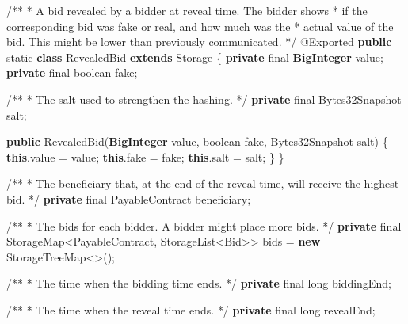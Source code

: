 \documentclass[a4paper,]{book}
\newenvironment{Shaded}{\begin{snugshade}}{\end{snugshade}}
\newcommand{\AttributeTok}[1]{\textcolor[rgb]{0.00,0.34,0.68}{#1}}
\newcommand{\BuiltInTok}[1]{\textcolor[rgb]{0.39,0.29,0.61}{\textbf{#1}}}
\newcommand{\CommentTok}[1]{\textcolor[rgb]{0.54,0.53,0.53}{#1}}
\newcommand{\DataTypeTok}[1]{\textcolor[rgb]{0.00,0.34,0.68}{#1}}
\newcommand{\FunctionTok}[1]{\textcolor[rgb]{0.39,0.29,0.61}{#1}}
\newcommand{\KeywordTok}[1]{\textcolor[rgb]{0.12,0.11,0.11}{\textbf{#1}}}
\newcommand{\NormalTok}[1]{\textcolor[rgb]{0.12,0.11,0.11}{#1}}
\renewenvironment{Shaded}{\begin{snugshade}\small}{\end{snugshade}}
\begin{document}
{\begin{Shaded}
\begin{Highlighting}[]
  \CommentTok{/**}
   \CommentTok{*}\NormalTok{ A bid revealed by a bidder at reveal time}\CommentTok{. }\NormalTok{The bidder shows}
   \CommentTok{*}\NormalTok{ if the corresponding bid was fake or real}\CommentTok{,}\NormalTok{ and how much was the}
   \CommentTok{*}\NormalTok{ actual value of the bid}\CommentTok{.}\NormalTok{ This might be lower than previously communicated}\CommentTok{.}
   \CommentTok{*/}
  \AttributeTok{@Exported}
  \KeywordTok{public} \DataTypeTok{static} \KeywordTok{class}\NormalTok{ RevealedBid }\KeywordTok{extends}\NormalTok{ Storage \{}
    \KeywordTok{private} \DataTypeTok{final} \BuiltInTok{BigInteger}\NormalTok{ value;}
    \KeywordTok{private} \DataTypeTok{final} \DataTypeTok{boolean}\NormalTok{ fake;}

    \CommentTok{/**}
     \CommentTok{*}\NormalTok{ The salt used to strengthen the hashing}\CommentTok{.}
     \CommentTok{*/}
    \KeywordTok{private} \DataTypeTok{final}\NormalTok{ Bytes32Snapshot salt;}

    \KeywordTok{public} \FunctionTok{RevealedBid}\NormalTok{(}\BuiltInTok{BigInteger}\NormalTok{ value, }\DataTypeTok{boolean}\NormalTok{ fake, Bytes32Snapshot salt) \{}
      \KeywordTok{this}\NormalTok{.}\FunctionTok{value}\NormalTok{ = value;}
      \KeywordTok{this}\NormalTok{.}\FunctionTok{fake}\NormalTok{ = fake;}
      \KeywordTok{this}\NormalTok{.}\FunctionTok{salt}\NormalTok{ = salt;}
\NormalTok{    \}}
\NormalTok{  \}}

  \CommentTok{/**}
   \CommentTok{*}\NormalTok{ The beneficiary that}\CommentTok{,}\NormalTok{ at the end of the reveal time}\CommentTok{,}\NormalTok{ will receive the highest bid}\CommentTok{.}
   \CommentTok{*/}
  \KeywordTok{private} \DataTypeTok{final}\NormalTok{ PayableContract beneficiary;}

  \CommentTok{/**}
   \CommentTok{*}\NormalTok{ The bids for each bidder}\CommentTok{. }\NormalTok{A bidder might place more bids}\CommentTok{.}
   \CommentTok{*/}
  \KeywordTok{private} \DataTypeTok{final}\NormalTok{ StorageMap<PayableContract, StorageList<Bid>> bids = }\KeywordTok{new}\NormalTok{ StorageTreeMap<>();}

  \CommentTok{/**}
   \CommentTok{*}\NormalTok{ The time when the bidding time ends}\CommentTok{.}
   \CommentTok{*/}
  \KeywordTok{private} \DataTypeTok{final} \DataTypeTok{long}\NormalTok{ biddingEnd;}

  \CommentTok{/**}
   \CommentTok{*}\NormalTok{ The time when the reveal time ends}\CommentTok{.}
   \CommentTok{*/}
  \KeywordTok{private} \DataTypeTok{final} \DataTypeTok{long}\NormalTok{ revealEnd;}


\end{Highlighting}
\end{Shaded}}
\end{document}

